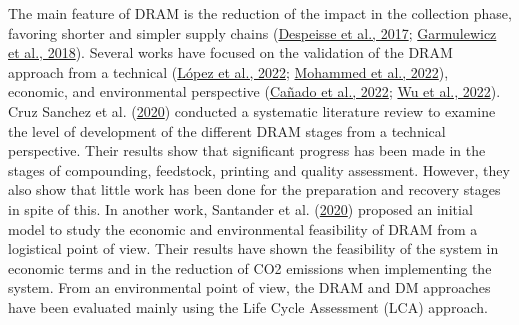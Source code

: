 \documentclass[12pt]{elsarticle} %
\begin{document}
The main feature of DRAM is the reduction of the impact in the collection phase, favoring shorter and simpler supply chains (\protect\hyperlink{ref-Despeisse2016}{Despeisse et al., 2017}; \protect\hyperlink{ref-Garmulewicz2018}{Garmulewicz et al., 2018}).
Several works have focused on the validation of the DRAM approach from a technical (\protect\hyperlink{ref-lopez2022}{López et al., 2022}; \protect\hyperlink{ref-Mohammed2022}{Mohammed et al., 2022}), economic, and environmental perspective (\protect\hyperlink{ref-canado2022}{Cañado et al., 2022}; \protect\hyperlink{ref-Wu2021a}{Wu et al., 2022}).
Cruz Sanchez et al. (\protect\hyperlink{ref-CruzSanchez2020}{2020}) conducted a systematic literature review to examine the level of development of the different DRAM stages from a technical perspective.
Their results show that significant progress has been made in the stages of compounding, feedstock, printing and quality assessment.
However, they also show that little work has been done for the preparation and recovery stages in spite of this.
In another work, Santander et al. (\protect\hyperlink{ref-Santander2020}{2020}) proposed an initial model to study the economic and environmental feasibility of DRAM from a logistical point of view. Their results have shown the feasibility of the system in economic terms and in the reduction of CO2 emissions when implementing the system.
From an environmental point of view, the DRAM and DM approaches have been evaluated mainly using the Life Cycle Assessment (LCA) approach.
\end{document}
